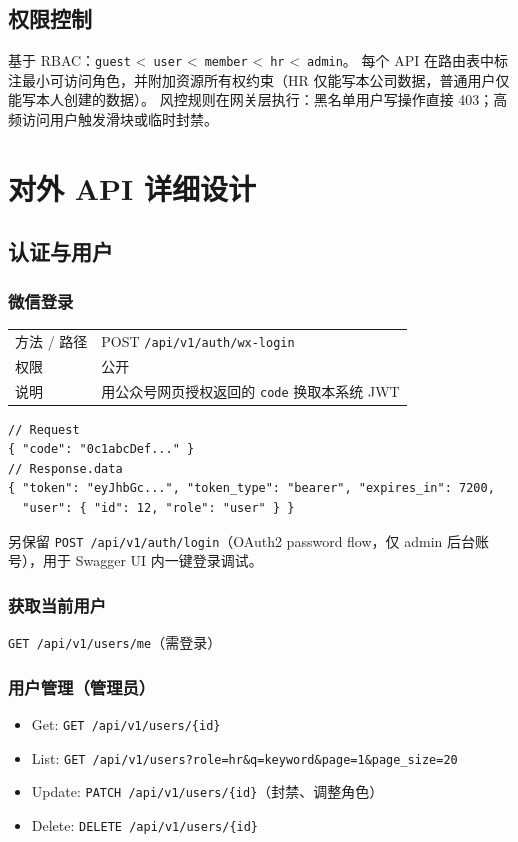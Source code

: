 \documentclass[11pt,a4paper]{ctexart}
\begin{document}
\subsection{权限控制}
基于 RBAC：\texttt{guest} \textless~\texttt{user} \textless~\texttt{member} \textless~\texttt{hr} \textless~\texttt{admin}。
每个 API 在路由表中标注最小可访问角色，并附加资源所有权约束（HR 仅能写本公司数据，普通用户仅能写本人创建的数据）。
风控规则在网关层执行：黑名单用户写操作直接 403；高频访问用户触发滑块或临时封禁。

\section{对外 API 详细设计}

\subsection{认证与用户}
\subsubsection{微信登录}
\begin{tabularx}{\textwidth}{lX}
\toprule
方法 / 路径 & POST \texttt{/api/v1/auth/wx-login}\\
权限 & 公开\\
说明 & 用公众号网页授权返回的 \texttt{code} 换取本系统 JWT\\
\bottomrule
\end{tabularx}
\begin{lstlisting}
// Request
{ "code": "0c1abcDef..." }
// Response.data
{ "token": "eyJhbGc...", "token_type": "bearer", "expires_in": 7200,
  "user": { "id": 12, "role": "user" } }
\end{lstlisting}
另保留 \texttt{POST /api/v1/auth/login}（OAuth2 password flow，仅 admin 后台账号），用于 Swagger UI 内一键登录调试。

\subsubsection{获取当前用户}
\texttt{GET /api/v1/users/me}（需登录）

\subsubsection{用户管理（管理员）}
\begin{itemize}[leftmargin=2em]
    \item Get: \texttt{GET /api/v1/users/\{id\}}
    \item List: \texttt{GET /api/v1/users?role=hr\&q=keyword\&page=1\&page\_size=20}
    \item Update: \texttt{PATCH /api/v1/users/\{id\}}（封禁、调整角色）
    \item Delete: \texttt{DELETE /api/v1/users/\{id\}}
\end{itemize}
\end{document}

